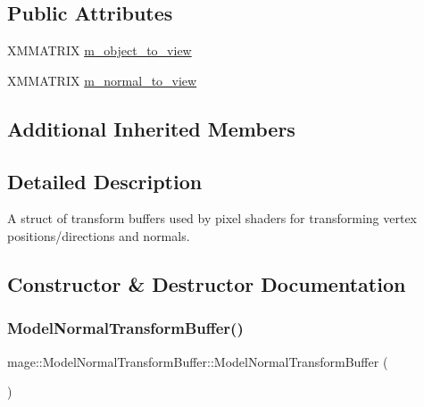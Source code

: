 \subsection*{Public Attributes}
\begin{DoxyCompactItemize}
\item 
X\+M\+M\+A\+T\+R\+IX \hyperlink{structmage_1_1_model_normal_transform_buffer_afd0823b56d399f56245a5e652b25e6d5}{m\+\_\+object\+\_\+to\+\_\+view}
\item 
X\+M\+M\+A\+T\+R\+IX \hyperlink{structmage_1_1_model_normal_transform_buffer_a1d79f8570b8bc020406e007f30bcfb13}{m\+\_\+normal\+\_\+to\+\_\+view}
\end{DoxyCompactItemize}
\subsection*{Additional Inherited Members}


\subsection{Detailed Description}
A struct of transform buffers used by pixel shaders for transforming vertex positions/directions and normals. 

\subsection{Constructor \& Destructor Documentation}
\hypertarget{structmage_1_1_model_normal_transform_buffer_a0ab367c167f3056d32ad06299d9953d0}{}\label{structmage_1_1_model_normal_transform_buffer_a0ab367c167f3056d32ad06299d9953d0} 
\subsubsection{\texorpdfstring{Model\+Normal\+Transform\+Buffer()}{ModelNormalTransformBuffer()}\hspace{0.1cm}{\footnotesize\ttfamily [1/3]}}
{\footnotesize\ttfamily mage\+::\+Model\+Normal\+Transform\+Buffer\+::\+Model\+Normal\+Transform\+Buffer (\begin{DoxyParamCaption}{ }\end{DoxyParamCaption})}

